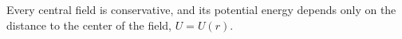 Every central field is conservative, and its potential energy depends only on the distance to the center of the field, $U = U(r)$.
